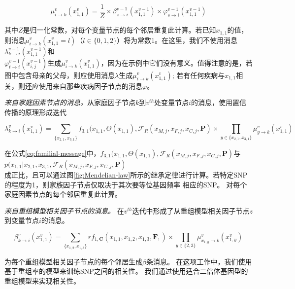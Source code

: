 \begin{equation}\label{eq:variable-message}
\mu_{i \rightarrow k}^v(x_{1,1}^v)= \frac{1}{Z} \times
\beta_{z \rightarrow i}^{v-1}(x_{1,1}^{v-1}) \times
\varphi_{s \rightarrow i}^{v-1}(x_{1,1}^{v-1})
\end{equation}

其中$Z$是归一化常数，对每个变量节点的每个邻居重复此计算。若已知$x_{1,1}$的值，则消息$\mu_{i \rightarrow k}^v(x_{1,1}^v =l)$（$l\in \{0,1,2\}$）将为常数1。在这里，我们不使用消息$\lambda_{k \rightarrow i}^{v-1}(x_{1,1}^{v-1})$和\\ $\varphi_{t \rightarrow i}^{v-1}(x_{i,j}^{v-1})$生成$\mu_{i \rightarrow k}^v(x_{1,1}^v)$，因为在示例中它们没有意义。值得注意的是，若图中包含母亲的父母，则应使用消息$\lambda$生成$\mu_{i \rightarrow k}^v(x_{1,1}^v)$; 若有任何疾病与$x_{1,1}$相关，则还应使用来自那些疾病因子节点的消息$\varphi$。

\emph{来自家庭因素节点的消息。}从家庭因子节点$k$到$v^{th}$处变量节点$i$的消息，使用置信传播的原理形成迭代

\begin{equation}
\label{eq:familial-message}
\lambda_{k \rightarrow i}^v(x_{1,1}^v) =  \sum_{\{x_{2,1},x_{3,1}\}}f_{3,1}(x_{1,1},\Theta(x_{1,1}),\mathcal{F}_{R}(x_{M,j},x_{F,j}, x_{C,j},\mathbf{P}) 
\times \prod_{y\in \{x_{2,1},x_{3,1}\}} \mu_{y \rightarrow k}^v(x_{1,1}^v)
\end{equation}

在公式\ref{eq:familial-message}中，$f_{3,1}(x_{1,1},\Theta(x_{1,1}),\mathcal{F}_{R}(x_{M,j},x_{F,j}, x_{C,j},\mathbf{P})$与$p(x_{1,1}| x_{2,1},x_{3,1},\mathcal{F}_{R}(x_{M,j},x_{F,j}, x_{C,j},\mathbf{P})$\\成正比，且可以通过图\ref{fig:Mendelian-law}所示的继承定律进行计算。若特定SNP的程度为1，则家族因子节点仅取决于其次要等位基因频率 相应的SNP。 对每个家庭因素节点的每个邻居重复此计算。


\emph{来自重组模型相关因子节点的消息。} 在$v^{th}$迭代中形成了从重组模型相关因子节点$z$到变量节点$i$的消息。

\begin{equation}\label{eq:relavtes-information}
\beta_{k \rightarrow i}^v(x_{1,1}^v) = \sum_{\{x_{1,2},x_{1,3}\}}rf_{1,\mathbf{C}}(x_{1,1},x_{1,2},x_{1,3},\mathbf{F},) \times  \prod_{y \in \{2,3\}} \mu_{x_{1,y} \rightarrow k}^v(x_{1,y}^v)
\end{equation}

为每个重组模型相关因子节点的每个邻居生成$\beta$条消息。 在这项工作中，我们使用基于重组率的模型来训练SNP之间的相关性。 我们通过使用适合二倍体基因型\cite{marchini2007newa}的重组模型来实现相关性。

